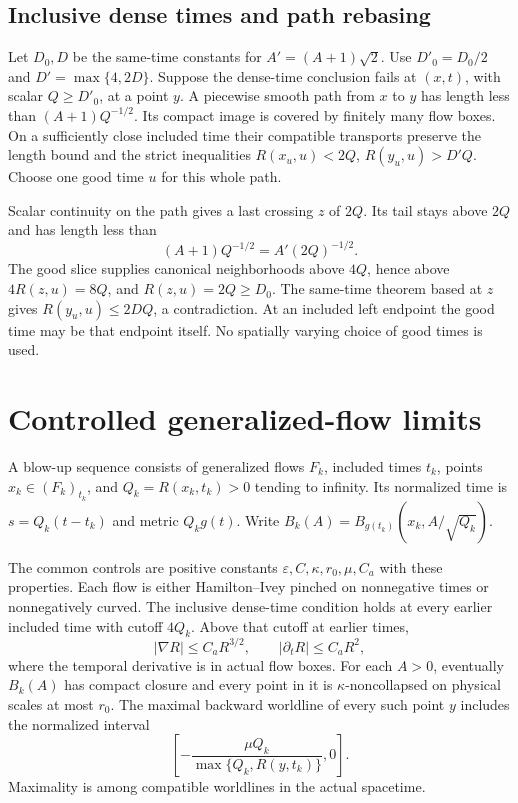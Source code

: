 \subsection{Inclusive dense times and path rebasing}

Let $D_0,D$ be the same-time constants for $A'=(A+1)\sqrt2$. Use
$D'_0=D_0/2$ and $D'=\max\{4,2D\}$. Suppose the dense-time conclusion
fails at $(x,t)$, with scalar $Q\geq D'_0$, at a point $y$.
A piecewise smooth path from $x$ to $y$ has length less than
$(A+1)Q^{-1/2}$. Its compact image is covered by finitely many flow boxes.
On a sufficiently close included time their compatible transports preserve
the length bound and the strict inequalities
$R(x_u,u)<2Q$, $R(y_u,u)>D'Q$. Choose one good time $u$ for this whole path.

Scalar continuity on the path gives a last crossing $z$ of $2Q$. Its tail
stays above $2Q$ and has length less than
\[
 (A+1)Q^{-1/2}=A'(2Q)^{-1/2}.
\]
The good slice supplies canonical neighborhoods above $4Q$, hence above
$4R(z,u)=8Q$, and $R(z,u)=2Q\geq D_0$. The same-time theorem based at
$z$ gives $R(y_u,u)\leq2DQ$, a contradiction. At an included left
endpoint the good time may be that endpoint itself. No spatially varying
choice of good times is used.

\section{Controlled generalized-flow limits}
\label{sec:singular-blowup}

\begin{definition}
\label{def:singular-blowup-sequence}
A blow-up sequence consists of generalized flows $F_k$, included times
$t_k$, points $x_k\in(F_k)_{t_k}$, and $Q_k=R(x_k,t_k)>0$ tending to
infinity. Its normalized time is $s=Q_k(t-t_k)$ and metric $Q_kg(t)$.
Write $B_k(A)=B_{g(t_k)}(x_k,A/\sqrt{Q_k})$.

The common controls are positive constants
$\varepsilon,C,\kappa,r_0,\mu,C_a$ with these properties. Each flow
is either Hamilton--Ivey pinched on nonnegative times or nonnegatively
curved. The inclusive dense-time condition holds at every earlier included
time with cutoff $4Q_k$. Above that cutoff at earlier times,
\[
 |\nabla R|\leq C_aR^{3/2},\qquad |\partial_tR|\leq C_aR^2,
\]
where the temporal derivative is in actual flow boxes. For each $A>0$,
eventually $B_k(A)$ has compact closure and every point in it is
$\kappa$-noncollapsed on physical scales at most $r_0$. The maximal
backward worldline of every such point $y$ includes the normalized interval
\begin{equation}
 \left[-\frac{\mu Q_k}{\max\{Q_k,R(y,t_k)\}},0\right].
 \label{eq:singular-survival}
\end{equation}
Maximality is among compatible worldlines in the actual spacetime.
\end{definition}


